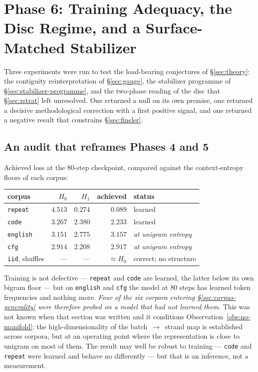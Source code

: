 
\section{Phase 6: Training Adequacy, the Disc Regime, and a Surface-Matched Stabilizer}
\label{sec:phase6}

Three experiments were run to test the load-bearing conjectures of
\S\ref{sec:theory}: the contiguity reinterpretation of \S\ref{sec:gauge}, the
stabilizer programme of \S\ref{sec:stabilizer-programme}, and the two-phase
reading of the disc that \S\ref{sec:rstrat} left unresolved. One returned a
null on its own premise, one returned a decisive methodological correction with
a first positive signal, and one returned a negative result that constrains
\S\ref{sec:finsler}.

\subsection{An audit that reframes Phases 4 and 5}
\label{sec:adequacy}

Achieved loss at the $80$-step checkpoint, compared against the context-entropy
floors of each corpus:

\begin{center}
\begin{tabular}{lrrrl}
\hline
corpus & $H_0$ & $H_1$ & achieved & status \\
\hline
\texttt{repeat}  & $4.513$ & $0.274$ & $0.089$ & learned \\
\texttt{code}    & $3.267$ & $2.380$ & $2.233$ & learned \\
\texttt{english} & $3.151$ & $2.775$ & $3.157$ & \emph{at unigram entropy} \\
\texttt{cfg}     & $2.914$ & $2.208$ & $2.917$ & \emph{at unigram entropy} \\
\texttt{iid}, shuffles & --- & --- & $\approx H_0$ & correct; no structure \\
\hline
\end{tabular}
\end{center}

Training is not defective --- \texttt{repeat} and \texttt{code} are learned,
the latter below its own bigram floor --- but on \texttt{english} and
\texttt{cfg} the model at $80$ steps has learned token frequencies and nothing
more. \emph{Four of the six corpora entering \S\ref{sec:corpus-generality} were
therefore probed on a model that had not learned them.} This was not known when
that section was written and it conditions
Observation~\ref{obs:no-manifold}: the high-dimensionality of the
batch~$\to$~strand map is established across corpora, but at an operating point
where the representation is close to unigram on most of them. The result may
well be robust to training --- \texttt{code} and \texttt{repeat} were learned
and behave no differently --- but that is an inference, not a measurement.

